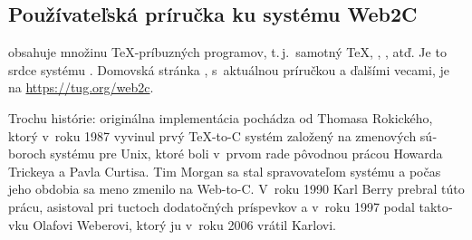 \documentclass[\classoptions,slovak,english,czech]{\classname}
\begin{document}
\begin{otherlanguage}{slovak}
\frenchspacing
\section{Používateľská príručka ku systému Web2C}
\Webc{} obsahuje množinu \TeX-príbuzných programov, t.\,j.\ samotný \TeX{},
\MF{}, \MP, \BibTeX{} atď. Je to srdce systému \TL{}. 
Domovská stránka \Webc{}, s~aktuálnou príručkou a ďalšími vecami, je na
\url{https://tug.org/web2c}. 

Trochu histórie: originálna implementácia pochádza
od Thomasa Rokického, ktorý v~roku 1987 vyvinul prvý
\TeX{}-to-C systém založený na zmenových súboroch systému pre Unix, ktoré
boli v~prvom rade pôvodnou prácou Howarda Trickeya a Pavla Curtisa.
Tim Morgan sa stal spravovateľom systému a počas jeho obdobia sa meno zmenilo
na Web-to-C\@. V~roku 1990 Karl Berry prebral túto prácu,
asistoval pri tuctoch dodatočných príspevkov a v~roku 1997 podal
taktovku Olafovi Weberovi, ktorý ju v~roku 2006 vrátil Karlovi.


\end{otherlanguage}
\end{document}

